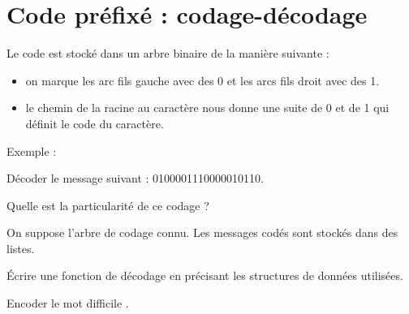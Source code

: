 \renewcommand{\SourceFile}{4-arborescences/src/4-3.ml}

\section{Code préfixé : codage-décodage}

Le code est stocké dans un arbre binaire de la manière suivante :
\begin{itemize}
    \item on marque les arc \og fils gauche \fg{} avec des 0 et les arcs \og fils droit \fg{} avec des 1.
    \item le chemin de la racine au caractère nous donne une suite de 0 et de 1 qui définit le code du caractère.
\end{itemize}
\medskip

Exemple :

\begin{center}
\end{center}

\Q
Décoder le message suivant : 0100001110000010110.
\medskip

Quelle est la particularité de ce codage ?

\Q
On suppose l'arbre de codage connu. Les messages codés sont stockés dans des listes.
\medskip

Écrire une fonction de décodage en précisant les structures de données utilisées.

\Q
Encoder le mot \og difficile \fg{}.
\medskip


